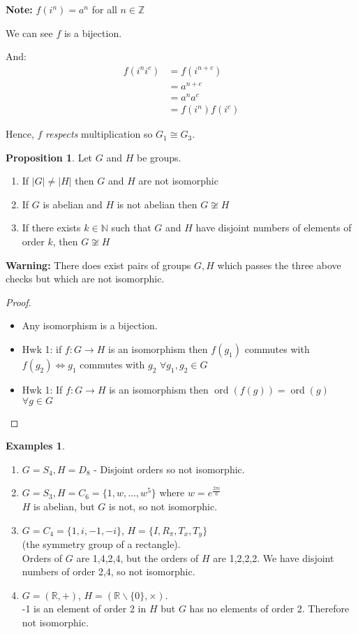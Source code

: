 \documentclass{article}
\theoremstyle{definition}
\newtheorem{proposition}{Proposition}
\newtheorem*{exmps}{Examples}
\newcommand{\reals}{\mathbb{R}}
\newcommand{\but}[2]{#1 \backslash \{#2\}}
\newcommand{\ism}{\cong}
\DeclareMathOperator{\ord}{\text{ord}}
\begin{document}
\textbf{Note:} $f(i^n) = a^n$ for all $n \in \mathbb{Z}$

We can see $f$ is a bijection.

And: 
\begin{align*}
  f(i^ni^c) &= f(i^{n+c})\\
  &= a^{n+c} \\
  &= a^n a^c \\
  &= f(i^n)f(i^c)
\end{align*}

Hence, $f$ \emph{respects} multiplication so $G_1 \ism G_3.$\\
\begin{proposition}
  Let $G$ and $H$ be groups.
  \begin{enumerate}
    \item If $|G| \neq |H|$ then $G$ and $H$ are not isomorphic
    \item If $G$ is abelian and $H$ is not abelian then $G \not\ism H$
    \item If there exists $k \in \mathbb{N}$ such that $G$ and $H$ have disjoint numbers of elements of order $k$, then $G \not\ism H$
  \end{enumerate}
\end{proposition}

\textbf{Warning:} There does exist pairs of groups $G, H$ which passes the three above checks but which are not isomorphic.

\begin{proof}\hfill
  \begin{itemize}
    \item Any isomorphism is a bijection.
    \item Hwk 1: 
      if $f : G \rightarrow H$ is an isomorphism then $f(g_1)$ commutes with $f(g_2) \iff g_1$ commutes with $g_2$ $\forall g_1,g_2 \in G$
    \item Hwk 1: 
      If $f:G\rightarrow H$ is an isomorphism then $\ord(f(g))=\ord(g)$ $\forall g\in G$
  \end{itemize}
\end{proof}

\begin{exmps}\hfill
\begin{enumerate}
  \item $G=S_4, H=D_8$ - Disjoint orders so not isomorphic.
  \item $G=S_3, H=C_6=\{1,w,\ldots,w^5\}$ where $w=e^{\frac{2 \pi i}{6}}$\\ $H$ is abelian, but $G$ is not, so not isomorphic.
  \item $G=C_4=\{1,i,-1,-i\}$, $H=\{I,R_\pi,T_x,T_y\}$ \\(the symmetry group of a rectangle). \\ Orders of $G$ are 1,4,2,4, but the orders of $H$ are 1,2,2,2. We have disjoint numbers of order 2,4, so not isomorphic.
  \item $G=(\mathbb{R}, +)$, $H=(\but{\reals}{0}, \times).$\\ -1 is an element of order 2 in $H$ but $G$ has no elements of order 2. Therefore not isomorphic.\\
\end{enumerate}
\end{exmps}
\end{document}
